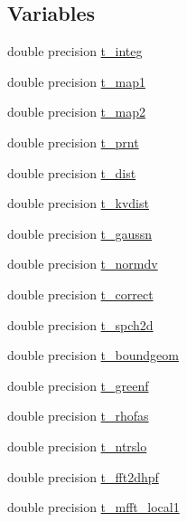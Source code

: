 \subsection*{Variables}
\begin{DoxyCompactItemize}
\item 
double precision \mbox{\hyperlink{namespacetimerclass_a27a1612019724dba83c6282789acd438}{t\+\_\+integ}}
\item 
double precision \mbox{\hyperlink{namespacetimerclass_add1e5cdff404cd8526ae448ac2fb7f04}{t\+\_\+map1}}
\item 
double precision \mbox{\hyperlink{namespacetimerclass_afedfbbf4bbafaa50343cdc8c6aa10f81}{t\+\_\+map2}}
\item 
double precision \mbox{\hyperlink{namespacetimerclass_a46c757a554e9df6d4b0afaa3705277be}{t\+\_\+prnt}}
\item 
double precision \mbox{\hyperlink{namespacetimerclass_a9b6b0481b5c71629a787a1e558afa8b0}{t\+\_\+dist}}
\item 
double precision \mbox{\hyperlink{namespacetimerclass_ab4a25c76f5337ddbe92d696962d74b8f}{t\+\_\+kvdist}}
\item 
double precision \mbox{\hyperlink{namespacetimerclass_a22ac90d37e89e2e290014ff2942f201d}{t\+\_\+gaussn}}
\item 
double precision \mbox{\hyperlink{namespacetimerclass_a5540a93d3b5aaa9f4e565dcb6d9d51ca}{t\+\_\+normdv}}
\item 
double precision \mbox{\hyperlink{namespacetimerclass_a6b31e88ecf075c6a84871dac40764766}{t\+\_\+correct}}
\item 
double precision \mbox{\hyperlink{namespacetimerclass_a999480c13b7174ab484db8ca3b22e8c1}{t\+\_\+spch2d}}
\item 
double precision \mbox{\hyperlink{namespacetimerclass_aa77a1d30c4b660cf6b3b63114d193793}{t\+\_\+boundgeom}}
\item 
double precision \mbox{\hyperlink{namespacetimerclass_aa38ad4042a025f6277353cc66f212a87}{t\+\_\+greenf}}
\item 
double precision \mbox{\hyperlink{namespacetimerclass_a90dda0e43d26c34adab1c014bf769b9a}{t\+\_\+rhofas}}
\item 
double precision \mbox{\hyperlink{namespacetimerclass_add80bbd91dff017ed09673ec91b01b61}{t\+\_\+ntrslo}}
\item 
double precision \mbox{\hyperlink{namespacetimerclass_a853c2d6920418548ad54bd15e9f822a1}{t\+\_\+fft2dhpf}}
\item 
double precision \mbox{\hyperlink{namespacetimerclass_ab7ead1f16d3ab25623889ad5459d9ce1}{t\+\_\+mfft\+\_\+local1}}

\end{DoxyCompactItemize}
